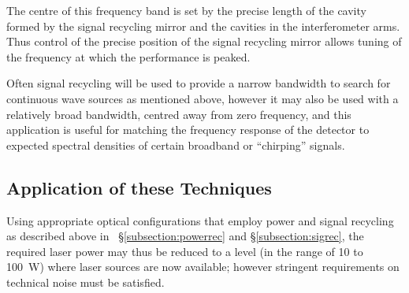 \documentclass{article}
\begin{document}

The centre of this frequency band is set by the precise length of the cavity
formed by the signal recycling mirror and the cavities in the interferometer
arms. Thus control of the precise position of the signal recycling mirror allows
tuning of the frequency at which the performance is peaked.

Often signal recycling will be used to provide a narrow bandwidth to search for
continuous wave sources as mentioned above, however it may also be used with a
relatively broad bandwidth, centred away from zero frequency, and this
application is useful for matching the frequency response of the detector to
expected spectral densities of certain broadband or ``chirping'' signals.



\subsection{Application of these Techniques}
\label{subsection:application}

Using appropriate optical configurations that employ power and signal recycling
as described above in ~\S\ref{subsection:powerrec} and
\S\ref{subsection:sigrec}, the required laser power may thus be reduced
to a level (in the range of 10 to 100~W) where laser sources are now available;
however stringent requirements on technical noise must be satisfied.
\end{document}
